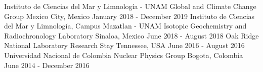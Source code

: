 

\begin{cventries}

  \cventry
    {Instituto de Ciencias del Mar y Limnología - UNAM} %
    {Global and Climate Change Group} %
    {Mexico City,  Mexico} %
    {January 2018 - December 2019} %
    {}
  \cventry
   {Instituto de Ciencias del Mar y Limnología, Campus Mazatlan - UNAM} %
    {Isotopic Geochemistry and Radiochronology Laboratory} %
    {Sinaloa, Mexico} %
    {June 2018 - August 2018} %
    {}
  \cventry
    {Oak Ridge National Laboratory} %
    {Research Stay} %
    {Tennessee, USA} %
    {June 2016 - August 2016} %
    {}
  \cventry
    {Universidad Nacional de Colombia} %
    {Nuclear Physics Group} %
    {Bogota, Colombia} %
    {June 2014 - December 2016} %
    {}
    
    



\end{cventries}

